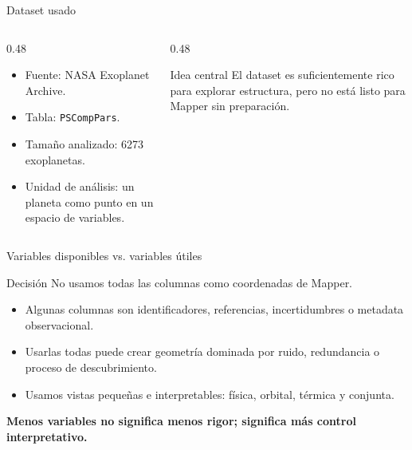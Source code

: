\documentclass[aspectratio=169,10pt]{beamer}
\newcommand{\takeaway}[1]{\begin{center}\small\textbf{#1}\end{center}}
\begin{document}
\begin{frame}{Dataset usado}
  \begin{columns}[T,onlytextwidth]
    \begin{column}{0.48\textwidth}
      \begin{itemize}
        \item Fuente: NASA Exoplanet Archive.
        \item Tabla: \texttt{PSCompPars}.
        \item Tama\~no analizado: 6273 exoplanetas.
        \item Unidad de an\'alisis: un planeta como punto en un espacio de variables.
      \end{itemize}
    \end{column}
    \begin{column}{0.48\textwidth}
      \begin{block}{Idea central}
        El dataset es suficientemente rico para explorar estructura, pero no est\'a listo para Mapper sin preparaci\'on.
      \end{block}
    \end{column}
  \end{columns}
\end{frame}

\begin{frame}{Variables disponibles vs. variables \'utiles}
  \begin{block}{Decisi\'on}
    No usamos todas las columnas como coordenadas de Mapper.
  \end{block}

  \begin{itemize}
    \item Algunas columnas son identificadores, referencias, incertidumbres o metadata observacional.
    \item Usarlas todas puede crear geometr\'ia dominada por ruido, redundancia o proceso de descubrimiento.
    \item Usamos vistas peque\~nas e interpretables: f\'isica, orbital, t\'ermica y conjunta.
  \end{itemize}

  \takeaway{Menos variables no significa menos rigor; significa m\'as control interpretativo.}
\end{frame}
\end{document}

